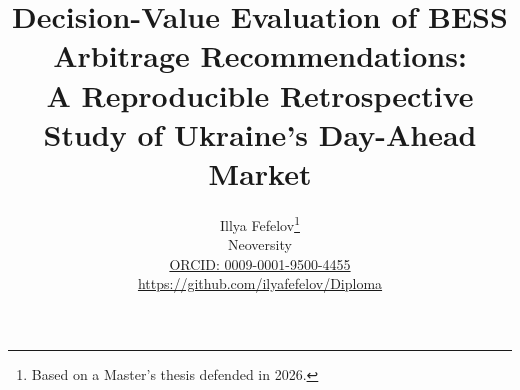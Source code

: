 \documentclass[10pt,twocolumn]{article}
\title{Decision-Value Evaluation of BESS Arbitrage Recommendations:\\A Reproducible Retrospective Study of Ukraine's Day-Ahead Market}
\author{Illya Fefelov\thanks{Based on a Master's thesis defended in 2026.}\\
\small Neoversity\\
\small \href{https://orcid.org/0009-0001-9500-4455}{ORCID: 0009-0001-9500-4455}\\
\small \url{https://github.com/ilyafefelov/Diploma}}
\date{}
\begin{document}
\maketitle












\balance


\end{document}
